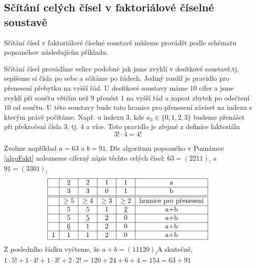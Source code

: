 \documentclass[czech,bachelor,dept470,male]{diploma}
\begin{document}
\subsection{Sčítání celých čísel v faktoriálové číselné soustavě}
Sčítání čísel v faktoriálové číselné soustavě můžeme provádět podle schématu popsaného\newline v následujícím příkladu.
\begin{remark}
	Sčítání čísel provádíme velice podobně jak jsme zvyklí v desítkové soustavě,\newline tj. sepíšeme si čísla po sebe a sčítáme po řádech. Jediný rozdíl je pravidlo pro přenesení přebytku na vyšší řád. U desítkové soustavy máme $10$ cifer a jsme zvyklí při součtu větším než $9$ přenést $1$ na vyšší řád a zapsat zbytek po odečtení $10$ od součtu. U této soustavy bude tato hranice pro přenesení záviset na indexu s kterým právě počítáme.
	Např. u indexu $3$, kde $a_3\in\{0,1,2,3\}$ budeme přenášet při překročení čísla $3$, tj. $4$ a více. Toto pravidlo je zřejmé z definice faktoriálu$$3!\cdot4=4!$$
\end{remark}
\begin{example}
	\item Zvolme například $a = 63$ a $b = 91$. Dle algoritmu popsaného v Poznámce \ref{algoFakt} nalezneme ciferný zápis těchto celých čísel: $63 = (2211)_!$ a $91 = (3301)_!$
	\begin{equation}\label{faktAddT1}
		\begin{tabular}{|c|c|c|c|c|c|}
			\hline
			 & 2      & 2             & 1      & 1             & a                     \\ \hline
			 & 3      & 3             & 0      & 1             & b                     \\ \hline \hline
			 & $\ge5$ & $\ge4$        & $\ge3$ & $\ge2$        & hranice pro přenesení \\ \hline
			 & 5      & 5             & 1      & \underline{2} & a+b                   \\ \hline
			 & 5      & \underline{5} & 2      & 0             & a+b                   \\ \hline & \underline{6} & 1             & 2      & 0             & a+b                   \\ \hline 1 & 1             & 1             & 2      & 0             & a+b                   \\ \hline
		\end{tabular} \end{equation} Z posledního řádku vyčteme, že $a + b = (11120)_!$\newline A skutečně, $1\cdot5!+1\cdot4!+1\cdot3!+2\cdot2!=120+24+6+4=\underline{154}=63+91$
\end{example}
\end{document}
